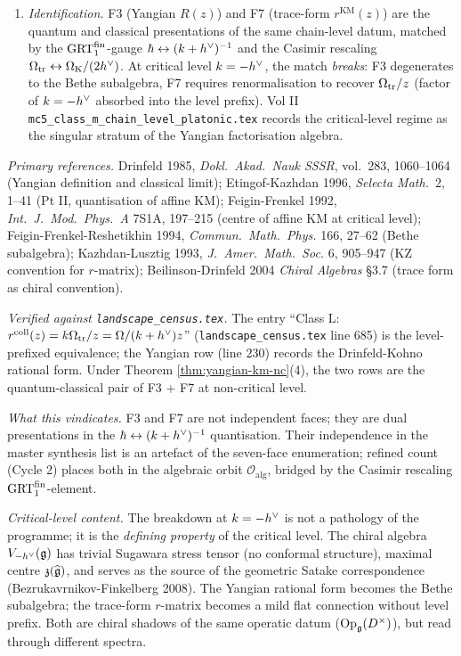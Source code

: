 \begin{theorem}
\begin{enumerate}
\item \emph{Identification.} F3 (Yangian $R(z)$) and F7 (trace-form
   $r^{\mathrm{KM}}(z)$) are the quantum and classical presentations of
   the same chain-level datum, matched by the $\mathrm{GRT}_1^{\mathrm{fin}}$-gauge
   $\hbar \leftrightarrow (k + h^{\vee})^{-1}$ and the Casimir rescaling
   $\Omega_{\mathrm{tr}} \leftrightarrow \Omega_{\mathrm{K}}/(2h^{\vee})$. At critical level $k = -h^{\vee}$,
   the match \emph{breaks}: F3 degenerates to the Bethe subalgebra, F7
   requires renormalisation to recover $\Omega_{\mathrm{tr}}/z$ (factor of $k = -h^{\vee}$
   absorbed into the level prefix). Vol II
   \texttt{mc5\_class\_m\_chain\_level\_platonic.tex} records the
   critical-level regime as the singular stratum of the Yangian
   factorisation algebra.
\end{enumerate}
\end{theorem}

\emph{Primary references.}
Drinfeld 1985, \emph{Dokl.\ Akad.\ Nauk SSSR}, vol.\ 283, 1060--1064
(Yangian definition and classical limit);
Etingof-Kazhdan 1996, \emph{Selecta Math.}\ 2, 1--41 (Pt II,
quantisation of affine KM);
Feigin-Frenkel 1992, \emph{Int.\ J.\ Mod.\ Phys.\ A} 7S1A, 197--215
(centre of affine KM at critical level);
Feigin-Frenkel-Reshetikhin 1994, \emph{Commun.\ Math.\ Phys.} 166,
27--62 (Bethe subalgebra);
Kazhdan-Lusztig 1993, \emph{J.\ Amer.\ Math.\ Soc.} 6, 905--947 (KZ
convention for $r$-matrix);
Beilinson-Drinfeld 2004 \emph{Chiral Algebras} \S3.7 (trace form as
chiral convention).

\emph{Verified against \texttt{landscape\_census.tex}.}
The entry ``Class L: $r^{\mathrm{coll}}(z) = k\Omega_{\mathrm{tr}}/z = \Omega/(k+h^{\vee})z$''
(\texttt{landscape\_census.tex} line 685) is the level-prefixed
equivalence; the Yangian row (line 230) records the Drinfeld-Kohno
rational form. Under Theorem \ref{thm:yangian-km-nc}(4), the two rows
are the quantum-classical pair of F3 + F7 at non-critical level.

\emph{What this vindicates.}
F3 and F7 are not independent faces; they are dual presentations in the
$\hbar \leftrightarrow (k+h^{\vee})^{-1}$ quantisation. Their independence
in the master synthesis list is an artefact of the seven-face
enumeration; refined count (Cycle 2) places both in the algebraic orbit
$\mathcal{O}_{\mathrm{alg}}$, bridged by the Casimir rescaling
$\mathrm{GRT}_1^{\mathrm{fin}}$-element.

\emph{Critical-level content.}
The breakdown at $k = -h^{\vee}$ is not a pathology of the programme; it is
the \emph{defining property} of the critical level. The chiral algebra
$V_{-h^{\vee}}(\mathfrak{g})$ has trivial Sugawara stress tensor (no conformal
structure), maximal centre $\mathfrak{z}(\widehat{\mathfrak{g}})$, and serves as
the source of the geometric Satake correspondence (Bezrukavrnikov-Finkelberg
2008). The Yangian rational form becomes the Bethe subalgebra; the
trace-form $r$-matrix becomes a mild flat connection without level
prefix. Both are chiral shadows of the same operatic datum
($\mathrm{Op}_{\mathfrak{g}}(D^\times)$), but read through different spectra.

